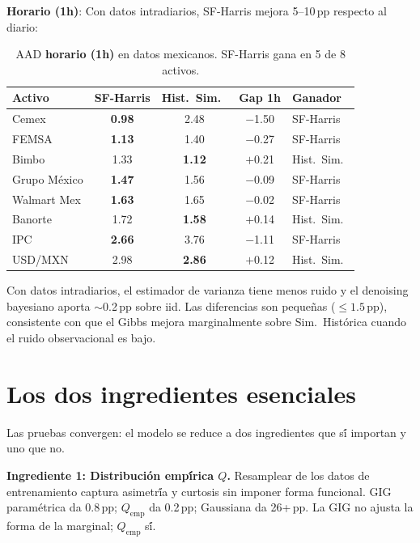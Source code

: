 \documentclass[12pt,letterpaper]{article}
\begin{document}
\textbf{Horario (1h)}: Con datos intradiarios, SF-Harris mejora 5--10\,pp respecto al diario:

\begin{table}[h]
\centering
\caption{AAD \textbf{horario (1h)} en datos mexicanos. SF-Harris gana en 5 de 8 activos.}
\label{tab:mexican-hourly}
\begin{tabular}{lcccl}
\toprule
Activo & SF-Harris & Hist.\ Sim.\ & Gap 1h & Ganador \\
\midrule
Cemex & \textbf{0.98} & 2.48 & $-$1.50 & SF-Harris \\
FEMSA & \textbf{1.13} & 1.40 & $-$0.27 & SF-Harris \\
Bimbo & 1.33 & \textbf{1.12} & $+$0.21 & Hist.\ Sim.\ \\
Grupo M\'{e}xico & \textbf{1.47} & 1.56 & $-$0.09 & SF-Harris \\
Walmart Mex & \textbf{1.63} & 1.65 & $-$0.02 & SF-Harris \\
Banorte & 1.72 & \textbf{1.58} & $+$0.14 & Hist.\ Sim.\ \\
IPC & \textbf{2.66} & 3.76 & $-$1.11 & SF-Harris \\
USD/MXN & 2.98 & \textbf{2.86} & $+$0.12 & Hist.\ Sim.\ \\
\bottomrule
\end{tabular}
\begin{flushleft}\small
Con datos intradiarios, el estimador de varianza tiene menos ruido y el denoising bayesiano aporta $\sim$0.2\,pp sobre iid. Las diferencias son peque\~{n}as ($\leq 1.5$\,pp), consistente con que el Gibbs mejora marginalmente sobre Sim.\ Hist\'{o}rica cuando el ruido observacional es bajo.
\end{flushleft}
\end{table}

\section{Los dos ingredientes esenciales}

Las pruebas convergen: el modelo se reduce a dos ingredientes que s\'{\'i} importan y uno que no.

\textbf{Ingrediente 1: Distribuci\'{o}n emp\'{\'i}rica $Q$.}
Resamplear de los datos de entrenamiento captura asimetr\'{\'i}a y curtosis sin imponer forma funcional. GIG param\'{e}trica da 0.8\,pp; $Q_{\text{emp}}$ da 0.2\,pp; Gaussiana da 26+\,pp. La GIG no ajusta la forma de la marginal; $Q_{\text{emp}}$ s\'{\'i}.
\end{document}
